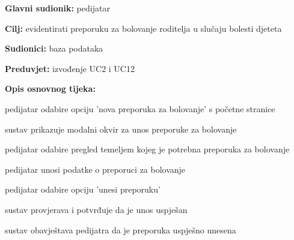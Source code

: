                     \noindent {}
					\begin{packed_item}
	
						\item \textbf{Glavni sudionik: }pedijatar
						\item  \textbf{Cilj:} evidentirati preporuku za bolovanje roditelja u slučaju bolesti djeteta
						\item  \textbf{Sudionici:} baza podataka
						\item  \textbf{Preduvjet:} izvođenje UC2 i UC12
						\item  \textbf{Opis osnovnog tijeka:}
						
						\item[] \begin{packed_enum}
	
							\item pedijatar odabire opciju 'nova preporuka za bolovanje' s početne stranice
							\item sustav prikazuje modalni okvir za unos preporuke za bolovanje
							\item pedijatar odabire pregled temeljem kojeg je potrebna preporuka za bolovanje
							\item pedijatar unosi podatke o preporuci za bolovanje
							\item pedijatar odabire opciju 'unesi preporuku'
							\item sustav provjerava i potvrđuje da je unos uspješan
							\item sustav obavještava pedijatra da je preporuka uspješno unesena
				
						\end{packed_enum}
                    \end{packed_item}
						
